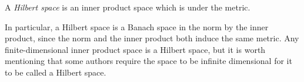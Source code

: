 \documentclass{article}
\begin{document}
A \emph{Hilbert space} is an inner product space which is  under the  metric.

In particular, a Hilbert space is a Banach space in the norm  by the inner product, since the norm and the inner product both induce the same metric.  Any finite-dimensional inner product space is a Hilbert space, but it is worth mentioning that some authors require the space to be infinite dimensional for it to be called a Hilbert space.
\end{document}
